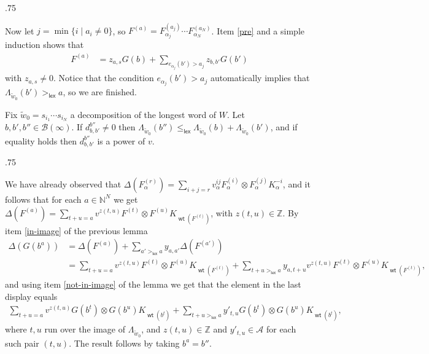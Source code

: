\documentclass[11pt,fleqn]{article}
\makeatletter
\renewenvironment{proof}[1][\textit{Proof}]{\par
  \pushQED{\qed}%
  \normalfont \topsep.75\paraskip\relax
  \trivlist
  \item[\hskip\labelsep
        \itshape
    #1\@addpunct{.}]\ignorespaces
}{%
  \popQED\endtrivlist\@endpefalse
}
\newcommand\NN{\mathbb N}
\newcommand\ZZ{\mathbb Z}
\newcommand\ot{\otimes}
\newcommand\A{\mathcal A}
\newcommand\B{\mathcal B}
\newcommand\lex{\mathsf{lex}}
\DeclareMathOperator\wt{\mathsf{wt}}
\makeatother
\begin{document}
\begin{proof}
Now let $j = \min \{i \mid a_i \neq 0\}$, so $F^{(a)} = F_{\alpha_j}^{(a_j)} 
\cdots F_{\alpha_N}^{(a_N)}$. Item \ref{pre} and a simple induction shows that
\begin{align*}
F^{(a)} 
  &= z_{a,s} G(b) 
  	+ \sum_{e_{\alpha_j}(b') > a_j} z_{b,b'} G(b')
\end{align*}
with $z_{a,s} \neq 0$. Notice that the condition $e_{\alpha_j}(b') > a_j$ 
automatically implies that $\Lambda_{\tilde w_0}(b') >_{\lex} a$, so we are 
finished.
\end{proof}

\begin{Proposition*}
Fix $\tilde w_0 = s_{i_1} \cdots s_{i_N}$ a decomposition of the longest word 
of $W$. Let $b,b',b'' \in \B(\infty)$. If $d_{b,b'}^{b''} \neq 0$ then 
$\Lambda_{\tilde w_0}(b'') \leq_{\lex} \Lambda_{\tilde w_0}(b) + 
\Lambda_{\tilde w_0}(b')$, and if equality holds then $d_{b,b'}^{b''}$
is a power of $v$.
\end{Proposition*}
\begin{proof}
We have already observed that $\Delta(F_\alpha^{(r)}) = \sum_{i+j = r} 
v_\alpha^{ij} F_\alpha^{(i)} \ot F_\alpha^{(j)} K^{-i}_\alpha$, and it follows 
that for each $a \in \NN^N$ we get $\Delta(F^{(a)}) = 
\sum_{t+u = a} v^{z(t,u)} F^{(t)} \ot F^{(u)}K_{\wt(F^{(t)})}$, with $z(t,u) 
\in \ZZ$. By item \ref{in-image} of the previous lemma 
\begin{align*}
\Delta(G(b^a))
  &= \Delta(F^{(a)}) + \sum_{a' >_{\lex} a} y_{a,a'} \Delta(F^{(a')}) \\
  &= \sum_{t+u = a} v^{z(t,u)} F^{(t)} \ot F^{(u)}K_{\wt(F^{(t)})} 
  + \sum_{t+u >_\lex a} y_{a,t+u} v^{z(t,u)} F^{(t)}
    \ot F^{(u)}K_{\wt(F^{(t)})},
\end{align*}
and using item \ref{not-in-image} of the lemma we get that the element in the 
last display equals
\begin{align*}
\sum_{t+u = a} v^{z(t,u)} G(b^t) \ot G(b^u) K_{\wt(b^t)}
    + \sum_{t+u >_{\lex} a} y'_{t,u} G(b^t) \ot G(b^u) K_{\wt(b^t)},
\end{align*}
where $t,u$ run over the image of $\Lambda_{\tilde w_0}$, and $z(t,u) \in \ZZ$
and $y'_{t,u} \in \A$ for each such pair $(t,u)$. The result follows by taking 
$b^a = b''$.
\end{proof}
\end{document}
